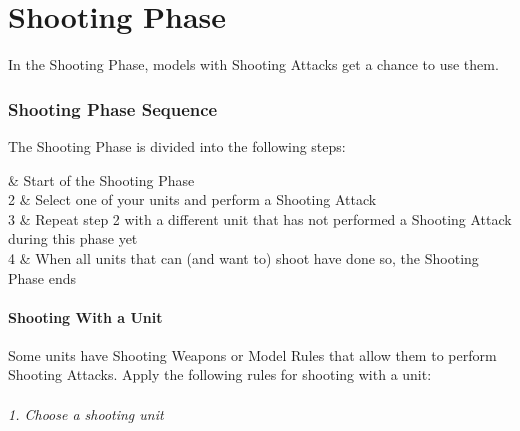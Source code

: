 
\newcommand{\figureLoSCSoftcover}{\Largefontsize{Soft Cover (\minuss{}1 to hit)}}
\newcommand{\figureLoSCNocover}{\Largefontsize{No cover}}
\newcommand{\figureLoSCStandard}{Standard}
\newcommand{\figureLoSCLarge}{Large}
\newcommand{\figureLoSCGigantic}{Gigantic}

\part{Shooting Phase}
\label{shooting_phase}

In the Shooting Phase, models with Shooting Attacks get a chance to use them.

\RBbmc

\section{Shooting Phase Sequence}
\label{shooting_phase_sequence}

The Shooting Phase is divided into the following steps:

 & Start of the Shooting Phase\\
	2 & Select one of your units and perform a Shooting Attack\\
	3 & Repeat step 2 with a different unit that has not performed a Shooting Attack during this phase yet\\
	4 & When all units that can (and want to) shoot have done so, the Shooting Phase ends\\
\closeseqtablemc

\subsection{Shooting With a Unit}
\label{shooting_with_a_unit}

Some units have Shooting Weapons or Model Rules that allow them to perform Shooting Attacks. Apply the following rules for shooting with a unit:

\paragraph{1. Choose a shooting unit}

